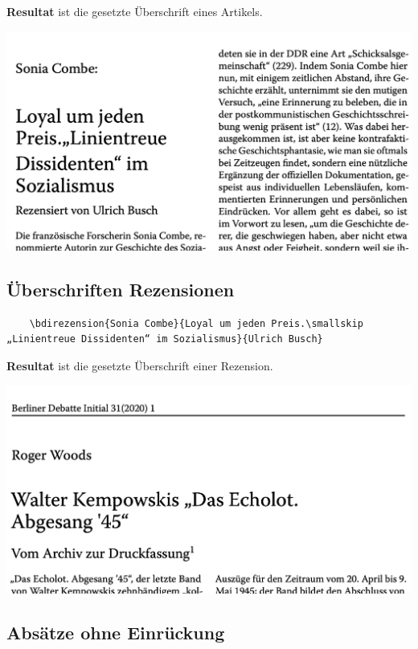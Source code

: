 \documentclass{article}
\begin{document}
\textbf{Resultat} ist die gesetzte Überschrift eines Artikels.

\begin{center}
    \includegraphics[scale=0.5]{rezensionen-headline.png}
\end{center}

\subsection{Überschriften Rezensionen}

\begin{lstlisting}
    \bdirezension{Sonia Combe}{Loyal um jeden Preis.\smallskip „Linientreue Dissidenten“ im Sozialismus}{Ulrich Busch}
\end{lstlisting}

\textbf{Resultat} ist die gesetzte Überschrift einer Rezension.

\begin{center}
    \includegraphics[scale=0.5]{bdichapter.png}
\end{center}

\subsection{Absätze ohne Einrückung}
\end{document}
